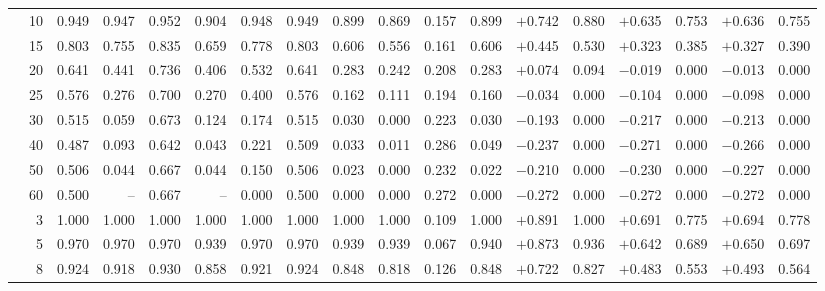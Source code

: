 \begin{table}[ht]
{\begin{tabular}{p{2.2cm}r rrrr rr rr rr rr rr rr}
  & 10 & 0.949 & 0.947 & 0.952 & 0.904 & 0.948 & 0.949 & 0.899 & 0.869 & 0.157 & 0.899 & $+$0.742 & 0.880 & $+$0.635 & 0.753 & $+$0.636 & 0.755 \\
  & 15 & 0.803 & 0.755 & 0.835 & 0.659 & 0.778 & 0.803 & 0.606 & 0.556 & 0.161 & 0.606 & $+$0.445 & 0.530 & $+$0.323 & 0.385 & $+$0.327 & 0.390 \\
  & 20 & 0.641 & 0.441 & 0.736 & 0.406 & 0.532 & 0.641 & 0.283 & 0.242 & 0.208 & 0.283 & $+$0.074 & 0.094 & $-$0.019 & 0.000 & $-$0.013 & 0.000 \\
  & 25 & 0.576 & 0.276 & 0.700 & 0.270 & 0.400 & 0.576 & 0.162 & 0.111 & 0.194 & 0.160 & $-$0.034 & 0.000 & $-$0.104 & 0.000 & $-$0.098 & 0.000 \\
  & 30 & 0.515 & 0.059 & 0.673 & 0.124 & 0.174 & 0.515 & 0.030 & 0.000 & 0.223 & 0.030 & $-$0.193 & 0.000 & $-$0.217 & 0.000 & $-$0.213 & 0.000 \\
  & 40 & 0.487 & 0.093 & 0.642 & 0.043 & 0.221 & 0.509 & 0.033 & 0.011 & 0.286 & 0.049 & $-$0.237 & 0.000 & $-$0.271 & 0.000 & $-$0.266 & 0.000 \\
  & 50 & 0.506 & 0.044 & 0.667 & 0.044 & 0.150 & 0.506 & 0.023 & 0.000 & 0.232 & 0.022 & $-$0.210 & 0.000 & $-$0.230 & 0.000 & $-$0.227 & 0.000 \\
  & 60 & 0.500 & -- & 0.667 & -- & 0.000 & 0.500 & 0.000 & 0.000 & 0.272 & 0.000 & $-$0.272 & 0.000 & $-$0.272 & 0.000 & $-$0.272 & 0.000 \\
\midrule
{}
  & 3  & 1.000 & 1.000 & 1.000 & 1.000 & 1.000 & 1.000 & 1.000 & 1.000 & 0.109 & 1.000 & $+$0.891 & 1.000 & $+$0.691 & 0.775 & $+$0.694 & 0.778 \\
  & 5  & 0.970 & 0.970 & 0.970 & 0.939 & 0.970 & 0.970 & 0.939 & 0.939 & 0.067 & 0.940 & $+$0.873 & 0.936 & $+$0.642 & 0.689 & $+$0.650 & 0.697 \\
  & 8  & 0.924 & 0.918 & 0.930 & 0.858 & 0.921 & 0.924 & 0.848 & 0.818 & 0.126 & 0.848 & $+$0.722 & 0.827 & $+$0.483 & 0.553 & $+$0.493 & 0.564 \\

\end{tabular}}
\end{table}
